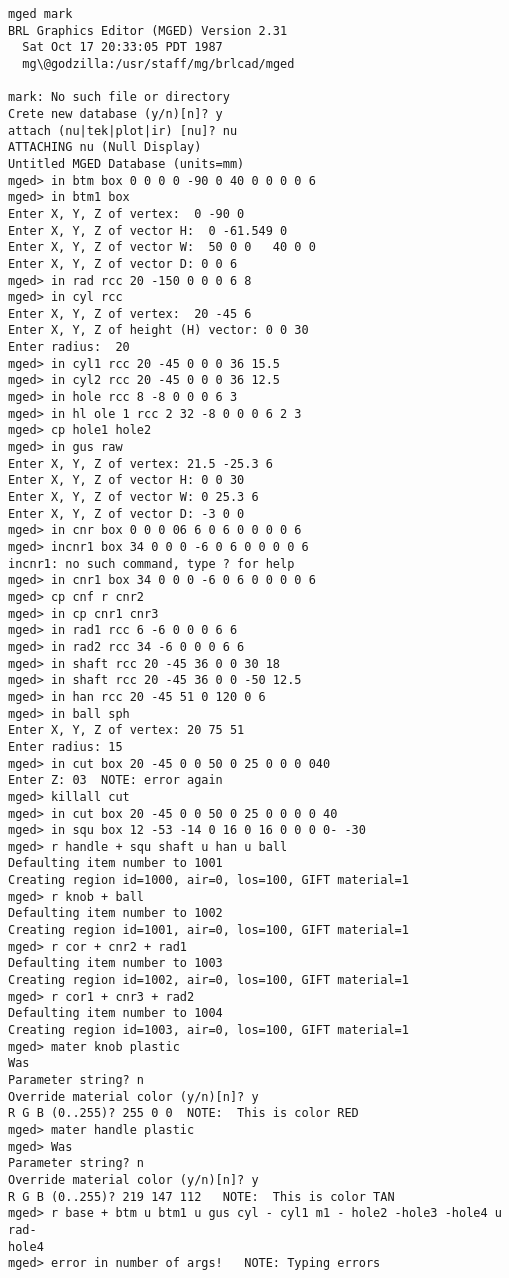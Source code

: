 \begin{verbatim}
mged mark
BRL Graphics Editor (MGED) Version 2.31
  Sat Oct 17 20:33:05 PDT 1987
  mg\@godzilla:/usr/staff/mg/brlcad/mged

mark: No such file or directory
Crete new database (y/n)[n]? y
attach (nu|tek|plot|ir) [nu]? nu
ATTACHING nu (Null Display)
Untitled MGED Database (units=mm)
mged> in btm box 0 0 0 0 -90 0 40 0 0 0 0 6
mged> in btm1 box
Enter X, Y, Z of vertex:  0 -90 0
Enter X, Y, Z of vector H:  0 -61.549 0
Enter X, Y, Z of vector W:  50 0 0   40 0 0 
Enter X, Y, Z of vector D: 0 0 6
mged> in rad rcc 20 -150 0 0 0 6 8
mged> in cyl rcc
Enter X, Y, Z of vertex:  20 -45 6
Enter X, Y, Z of height (H) vector: 0 0 30
Enter radius:  20
mged> in cyl1 rcc 20 -45 0 0 0 36 15.5
mged> in cyl2 rcc 20 -45 0 0 0 36 12.5
mged> in hole rcc 8 -8 0 0 0 6 3 
mged> in hl ole 1 rcc 2 32 -8 0 0 0 6 2 3
mged> cp hole1 hole2
mged> in gus raw
Enter X, Y, Z of vertex: 21.5 -25.3 6
Enter X, Y, Z of vector H: 0 0 30
Enter X, Y, Z of vector W: 0 25.3 6
Enter X, Y, Z of vector D: -3 0 0
mged> in cnr box 0 0 0 06 6 0 6 0 0 0 0 6
mged> incnr1 box 34 0 0 0 -6 0 6 0 0 0 0 6
incnr1: no such command, type ? for help
mged> in cnr1 box 34 0 0 0 -6 0 6 0 0 0 0 6
mged> cp cnf r cnr2
mged> in cp cnr1 cnr3
mged> in rad1 rcc 6 -6 0 0 0 6 6
mged> in rad2 rcc 34 -6 0 0 0 6 6 
mged> in shaft rcc 20 -45 36 0 0 30 18
mged> in shaft rcc 20 -45 36 0 0 -50 12.5
mged> in han rcc 20 -45 51 0 120 0 6
mged> in ball sph
Enter X, Y, Z of vertex: 20 75 51
Enter radius: 15
mged> in cut box 20 -45 0 0 50 0 25 0 0 0 040
Enter Z: 03  NOTE: error again
mged> killall cut
mged> in cut box 20 -45 0 0 50 0 25 0 0 0 0 40
mged> in squ box 12 -53 -14 0 16 0 16 0 0 0 0- -30
mged> r handle + squ shaft u han u ball
Defaulting item number to 1001
Creating region id=1000, air=0, los=100, GIFT material=1
mged> r knob + ball
Defaulting item number to 1002
Creating region id=1001, air=0, los=100, GIFT material=1
mged> r cor + cnr2 + rad1
Defaulting item number to 1003
Creating region id=1002, air=0, los=100, GIFT material=1
mged> r cor1 + cnr3 + rad2
Defaulting item number to 1004
Creating region id=1003, air=0, los=100, GIFT material=1
mged> mater knob plastic
Was
Parameter string? n
Override material color (y/n)[n]? y
R G B (0..255)? 255 0 0  NOTE:  This is color RED
mged> mater handle plastic
mged> Was
Parameter string? n
Override material color (y/n)[n]? y
R G B (0..255)? 219 147 112   NOTE:  This is color TAN
mged> r base + btm u btm1 u gus cyl - cyl1 m1 - hole2 -hole3 -hole4 u rad-
hole4
mged> error in number of args!   NOTE: Typing errors

\end{verbatim}
